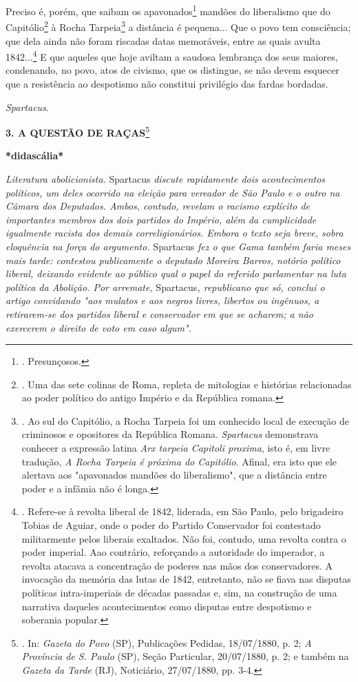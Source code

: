 Preciso é, porém, que saibam os apavonados\footnote{. Presunçosos.}
mandões do liberalismo que do Capitólio\footnote{. Uma das sete colinas
  de Roma, repleta de mitologias e histórias relacionadas ao poder
  político do antigo Império e da República romana.} à Rocha
Tarpeia\footnote{. Ao sul do Capitólio, a Rocha Tarpeia foi um conhecido
  local de execução de criminosos e opositores da República Romana.
  \emph{Spartacus} demonstrava conhecer a expressão latina \emph{Arx
  tarpeia Capitoli proxima}, isto é, em livre tradução, \emph{A Rocha
  Tarpeia é próxima do Capitólio}. Afinal, era isto que ele alertava aos
  "apavonados mandões do liberalismo", que a distância entre poder e a
  infâmia não é longa.} a distância é pequena... Que o povo tem
consciência; que dela ainda não foram riscadas datas memoráveis, entre
as quais avulta 1842...\footnote{. Refere-se à revolta liberal de 1842,
  liderada, em São Paulo, pelo brigadeiro Tobias de Aguiar, onde o poder
  do Partido Conservador foi contestado militarmente pelos liberais
  exaltados. Não foi, contudo, uma revolta contra o poder imperial. Aao
  contrário, reforçando a autoridade do imperador, a revolta atacava a
  concentração de poderes nas mãos dos conservadores. A invocação da
  memória das lutas de 1842, entretanto, não se fiava nas disputas
  políticas intra-imperiais de décadas passadas e, sim, na construção de
  uma narrativa daqueles acontecimentos como disputas entre despotismo e
  soberania popular.} E que
aqueles que hoje aviltam a saudosa lembrança dos seus maiores,
condenando, no povo, atos de civismo, que os distingue, se não devem
esquecer que a resistência ao despotismo não constitui privilégio das
fardas bordadas.

\emph{Spartacus}.

\textbf{3. A QUESTÃO DE RAÇAS}\footnote{. In: \emph{Gazeta do Povo}
  (SP), Publicações Pedidas, 18/07/1880, p. 2; \emph{A Província de S.
  Paulo} (SP), Seção Particular, 20/07/1880, p. 2; e também na
  \emph{Gazeta da Tarde} (RJ), Noticiário, 27/07/1880, pp. 3-4.}

\textbf{*didascália*}

\emph{Literatura abolicionista.} Spartacus \emph{discute rapidamente
dois acontecimentos políticos, um deles ocorrido na eleição para
vereador de São Paulo e o outro na Câmara dos Deputados. Ambos, contudo,
revelam o racismo explícito de importantes membros dos dois partidos do
Império, além da cumplicidade igualmente racista dos demais
correligionários. Embora o texto seja breve, sobra eloquência na força
do argumento.} Spartacus \emph{fez o que Gama também faria meses mais
tarde: contestou publicamente o deputado Moreira Barros, notório
político liberal, deixando evidente ao público qual o papel do referido
parlamentar na luta política da Abolição. Por arremate,}
Spartacus\emph{, republicano que só, conclui o artigo convidando "aos
mulatos e aos negros livres, libertos ou ingênuos, a retirarem-se dos
partidos liberal e conservador em que se acharem; a não exercerem o
direito de voto em caso algum".}

